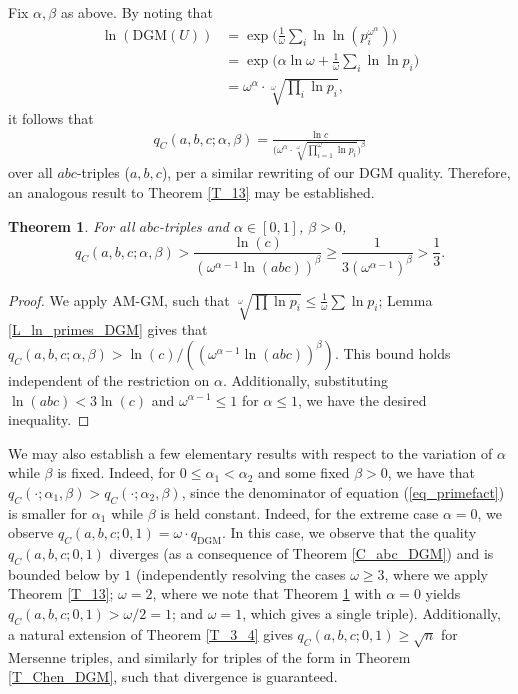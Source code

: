 \documentclass[11pt,letterpaper]{amsart}
\newtheorem{theorem}{Theorem}[section]
\begin{document}
Fix $\alpha, \beta$ as above. By noting that
\begin{align*}
    \ln(\mathrm{DGM}(U)) &= \exp\bigl(\tfrac{1}{\omega}\textstyle\sum_i\ln\ln(p_i^{\omega^\alpha})\bigr)\\
&= \exp\bigl(\alpha\ln\omega+\tfrac{1}{\omega}\textstyle\sum_i\ln\ln p_i\bigr)\\
&= \omega^\alpha\cdot\sqrt[\omega]{\textstyle\prod_i\ln p_i},
\end{align*}
it follows that 
\begin{align}
\label{eq_primefact}
    q_C(a,b,c;\alpha,\beta) = \frac{\ln c}{\bigl(\omega^\alpha\cdot\sqrt[\omega]{\prod_{i=1}^\omega \ln p_i}\bigr)^\beta}
\end{align}
over all $abc$-triples ($a, b, c$), per a similar rewriting of our DGM quality. Therefore, an analogous result to Theorem \ref{T_13} may be established.

\begin{theorem}\label{T_6.3}
For all $abc$-triples and $\alpha \in [0,1]$, $\beta>0$,
\[
q_C(a,b,c;\alpha,\beta) > \frac{\ln(c)}{(\omega^{\alpha - 1} \ln(abc))^{\beta}} \ge \frac{1}{3(\omega^{\alpha-1})^\beta}>\frac
{1}{3}.
\]
\end{theorem}
\begin{proof}
We apply AM-GM, such that $\sqrt[\omega]{\prod\ln p_i}\le\tfrac{1}{\omega}\sum\ln p_i$; Lemma \ref{L_ln_primes_DGM} gives that $q_C(a, b, c; \alpha, \beta) > \ln(c)/((\omega^{\alpha - 1} \ln(abc))^{\beta})$. This bound holds independent of the restriction on $\alpha$. Additionally, substituting $\ln(abc) < 3 \ln(c)$ and $\omega^{\alpha - 1} \leq 1$ for $\alpha \leq 1$, we have the desired inequality.
\end{proof}

We may also establish a few elementary results with respect to the variation of $\alpha$ while $\beta$ is fixed. Indeed, for $0 \leq \alpha_1 < \alpha_2$ and some fixed $\beta > 0$, we have that $q_C(\cdot; \alpha_1, \beta) > q_C(\cdot; \alpha_2, \beta)$, since the denominator of equation (\ref{eq_primefact}) is smaller for $\alpha_1$ while $\beta$ is held constant. Indeed, for the extreme case $\alpha = 0$, we observe $q_C(a,b,c;0,1)=\omega\cdot q_{\mathrm{DGM}}$. In this case, we observe that the quality $q_C(a,b,c;0,1)$ diverges (as a consequence of Theorem \ref{C_abc_DGM}) and is bounded below by $1$ (independently resolving the cases $\omega \ge 3$, where we apply Theorem \ref{T_13}; $\omega = 2$, where we note that Theorem \ref{T_6.3} with $\alpha = 0$ yields $q_C(a, b, c;0, 1) > \omega/2 = 1$; and $\omega = 1$, which gives a single triple). Additionally, a natural extension of Theorem \ref{T_3_4} gives $q_C(a,b,c;0,1)\ge\sqrt{n}$ for Mersenne triples, and similarly for triples of the form in Theorem \ref{T_Chen_DGM}, such that divergence is guaranteed.
\end{document}
